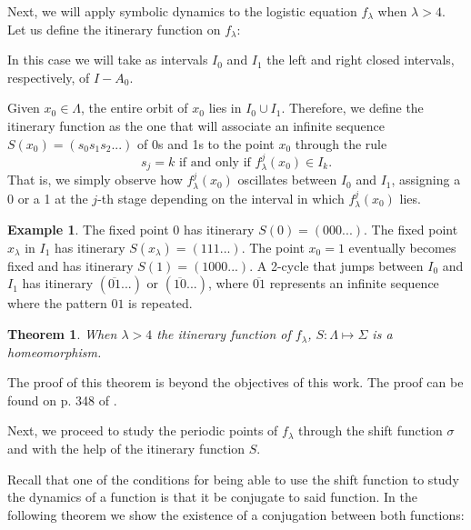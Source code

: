 \documentclass[12pt,a4paper]{report}
\newtheorem{teorema}{Theorem}[section]
\theoremstyle{definition}
\newtheorem{ejemplo}{Example}[section]
\begin{document}
Next, we will apply symbolic dynamics to the logistic equation \(f_{\lambda}\) when $\lambda > 4$. Let us define the itinerary function on \(f_{\lambda}\):

In this case we will take as intervals \(I_{0}\) and \(I_{1}\) the left and right closed intervals, respectively, of \(I-A_0\). 

Given \(x_{0}\in\Lambda\), the entire orbit of \(x_{0}\) lies in \(I_{0}\cup I_{1}\). Therefore, we define the itinerary function as the one that will associate an infinite sequence \(S(x_{0})=(s_{0}s_{1}s_{2}...)\) of 0s and 1s to the point \(x_{0}\) through the rule
\[
s_{j}=k \text{ if and only if } f_{\lambda}^{j}(x_{0})\in I_{k}.
\]
%
That is, we simply observe how \(f_{\lambda}^{j}(x_{0})\) oscillates between \(I_{0}\) and \(I_{1}\), assigning a 0 or a 1 at the \(j\)-th stage depending on the interval in which \(f_{\lambda}^{j}(x_{0})\) lies.

\begin{ejemplo}
    
The fixed point 0 has itinerary \(S(0)=(000...)\). The fixed point \(x_{\lambda}\) in \(I_{1}\) has itinerary \(S(x_{\lambda})=(111...)\). The point \(x_{0}=1\) eventually becomes fixed and has itinerary \(S(1)=(1000...)\). A 2-cycle that jumps between \(I_{0}\) and \(I_{1}\) has itinerary \((\overline{01}...)\) or \((\overline{10}...)\), where \(\overline{01}\) represents an infinite sequence where the pattern $01$ is repeated.

\end{ejemplo}

\begin{teorema}

When $\lambda > 4$ the itinerary function of $f_{\lambda}$, $S : \Lambda \mapsto \Sigma$ is a homeomorphism.

\end{teorema}


The proof of this theorem is beyond the objectives of this work. The proof can be found on p. 348 of \cite{ref1}.

Next, we proceed to study the periodic points of $f_{\lambda}$ through the shift function $\sigma$ and with the help of the itinerary function $S$.

Recall that one of the conditions for being able to use the shift function to study the dynamics of a function is that it be conjugate to said function. In the following theorem we show the existence of a conjugation between both functions: 
\end{document}
